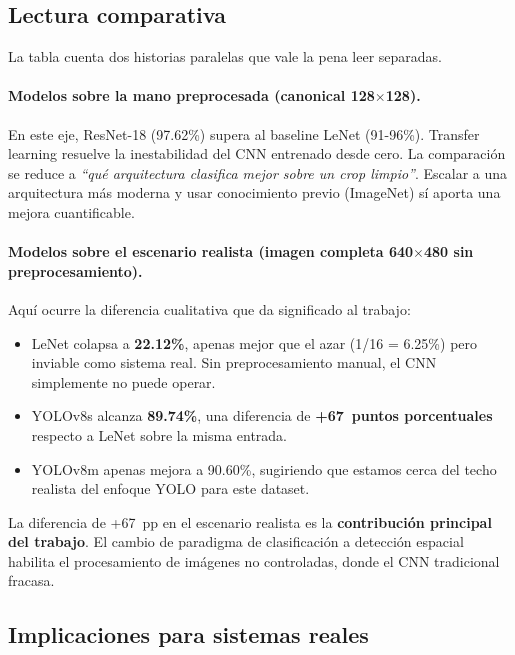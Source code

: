 \documentclass[a4paper,11pt]{article}
\begin{document}
\subsection{Lectura comparativa}

La tabla cuenta dos historias paralelas que vale la pena leer separadas.

\paragraph{Modelos sobre la mano preprocesada (canonical 128$\times$128).} En este eje, ResNet-18 (97.62\%) supera al baseline LeNet (91-96\%). Transfer learning resuelve la inestabilidad del CNN entrenado desde cero. La comparación se reduce a \emph{``qué arquitectura clasifica mejor sobre un crop limpio''}. Escalar a una arquitectura más moderna y usar conocimiento previo (ImageNet) sí aporta una mejora cuantificable.

\paragraph{Modelos sobre el escenario realista (imagen completa 640$\times$480 sin preprocesamiento).} Aquí ocurre la diferencia cualitativa que da significado al trabajo:

\begin{itemize}[itemsep=3pt]
    \item LeNet colapsa a \textbf{22.12\%}, apenas mejor que el azar (1/16 = 6.25\%) pero inviable como sistema real. Sin preprocesamiento manual, el CNN simplemente no puede operar.
    \item YOLOv8s alcanza \textbf{89.74\%}, una diferencia de \textbf{+67~puntos porcentuales} respecto a LeNet sobre la misma entrada.
    \item YOLOv8m apenas mejora a 90.60\%, sugiriendo que estamos cerca del techo realista del enfoque YOLO para este dataset.
\end{itemize}

La diferencia de +67~pp en el escenario realista es la \textbf{contribución principal del trabajo}. El cambio de paradigma de clasificación a detección espacial habilita el procesamiento de imágenes no controladas, donde el CNN tradicional fracasa.

\subsection{Implicaciones para sistemas reales}
\end{document}
